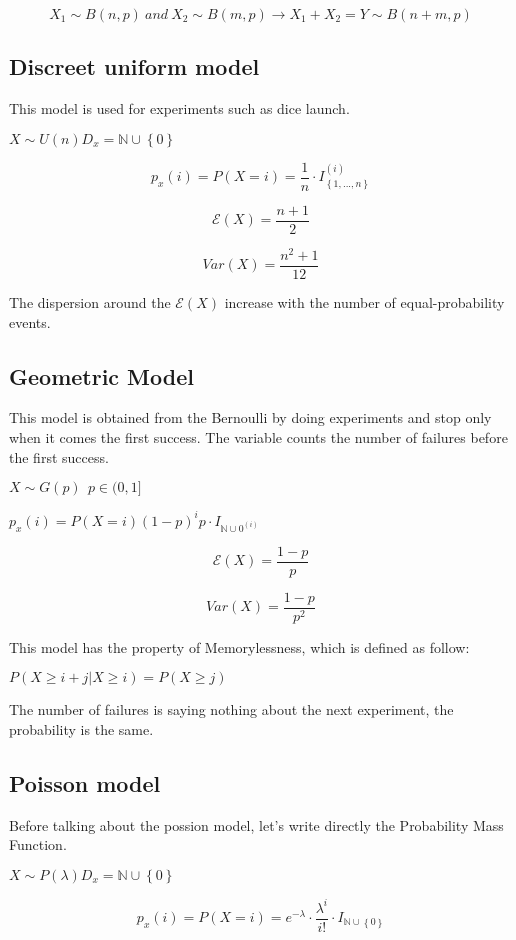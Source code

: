 \documentclass{article}
\begin{document}
$$X_1 \sim B(n,p) \ and \ X_2 \sim B(m,p) \rightarrow X_1 + X_2 = Y \sim B(n+m,p)$$


\subsection{Discreet uniform model}

This model is used for experiments such as dice launch.

$X \sim U(n) D_x = \mathbb{N} \cup \left\{0\right\}$

$$p_x(i) = P(X = i) = \frac{1}{n} \cdot I_\left\{1,...,n\right\}^(i)$$
\bigskip

$$\mathcal E(X) = \frac{n+1}{2}$$

$$Var(X) = \frac{n^2 +1}{12}$$

The dispersion around the $\mathcal E(X)$ increase with the number of equal-probability events.


\subsection{Geometric Model}

This model is obtained from the Bernoulli by doing experiments and stop only when it comes the first success. The variable counts the number of failures before the first success. 
\bigskip

$X \sim G(p) \ \ p \in (0,1]$

$p_x(i) = P(X=i) (1-p)^i p \cdot I_{\mathbb{N} \cup {0}^(i)}$
\bigskip

$$\mathcal E(X) = \frac{1-p}{p}$$

$$Var(X) = \frac{1-p}{p^2}$$
\bigskip

This model has the property of Memorylessness, which is defined as follow:

$P(X \geq i + j| X \geq i) = P(X \geq j)$

The number of failures is saying nothing about the next experiment, the probability is the same.

\subsection{Poisson model}

Before talking about the possion model, let's write directly the Probability Mass Function.

$X \sim P(\lambda) D_x = \mathbb{N} \cup \left\{0\right\}$
\bigskip

$$p_x(i) = P(X=i) = e^{- \lambda} \cdot \frac{\lambda^i}{i!} \cdot I_{\mathbb{N} \cup \left\{0\right\}}$$
\end{document}
